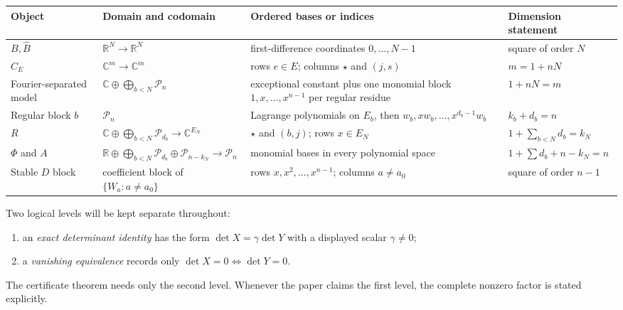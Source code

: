 \documentclass[11pt]{amsart}
\newcommand{\R}{\mathbb R}
\newcommand{\C}{\mathbb C}
\newcommand{\cB}{\widehat B}
\newcommand{\PP}{\mathcal P}
\newcommand{\1}{\mathbf 1}
\theoremstyle{remark}
\begin{document}
\begin{center}
\small
\begin{tabularx}{\textwidth}{@{}>{\raggedright\arraybackslash}p{}>{\raggedright\arraybackslash}p{}>{\raggedright\arraybackslash}p{}X@{}}
\toprule
Object & Domain and codomain & Ordered bases or indices & Dimension statement \\
\midrule
$B,\cB$ & $\R^N\to\R^N$ & first-difference coordinates $0,\ldots,N-1$ & square of order $N$ \\
$C_E$ & $\C^m\to\C^m$ & rows $e\in E$; columns $\star$ and $(j,s)$ & $m=1+nN$ \\
Fourier-separated model & $\C\oplus\bigoplus_{b<N}\PP_n$ & exceptional constant plus one monomial block $1,x,\ldots,x^{n-1}$ per regular residue & $1+nN=m$ \\
Regular block $b$ & $\PP_n$ & Lagrange polynomials on $E_b$, then $w_b,xw_b,\ldots,x^{d_b-1}w_b$ & $k_b+d_b=n$ \\
$R$ & $\C\oplus\bigoplus_{b<N}\PP_{d_b}\to\C^{E_N}$ & $\star$ and $(b,j)$; rows $x\in E_N$ & $1+\sum_{b<N}d_b=k_N$ \\
$\Phi$ and $A$ & $\R\oplus\bigoplus_{b<N}\PP_{d_b}\oplus\PP_{n-k_N}\to\PP_n$ & monomial bases in every polynomial space & $1+\sum d_b+n-k_N=n$ \\
Stable $D$ block & coefficient block of $\{W_a:a\ne a_0\}$ & rows $x,x^2,\ldots,x^{n-1}$; columns $a\ne a_0$ & square of order $n-1$ \\
\bottomrule
\end{tabularx}
\end{center}

Two logical levels will be kept separate throughout:
\begin{enumerate}[label=(\roman*)]
\item an \emph{exact determinant identity} has the form $\det X=\gamma\det Y$ with a displayed scalar $\gamma\ne0$;
\item a \emph{vanishing equivalence} records only $\det X=0\Longleftrightarrow\det Y=0$.
\end{enumerate}
The certificate theorem needs only the second level. Whenever the paper claims the first level, the complete nonzero factor is stated explicitly.
\end{document}
